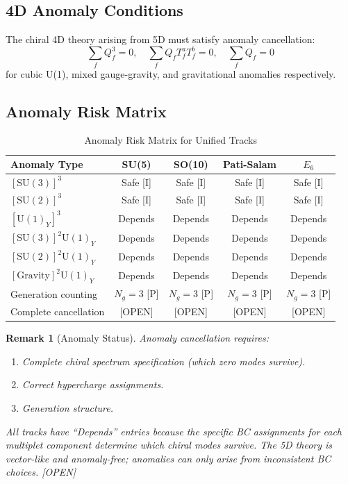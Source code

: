 \documentclass[11pt,a4paper]{article}
\newtheorem{remark}[theorem]{Remark}
\begin{document}
\subsection{4D Anomaly Conditions}

The chiral 4D theory arising from 5D must satisfy anomaly cancellation:
\begin{equation}
\sum_f Q_f^3 = 0, \quad \sum_f Q_f T_f^a T_f^b = 0, \quad \sum_f Q_f = 0
\label{eq:anomaly-conditions}
\end{equation}
for cubic U(1), mixed gauge-gravity, and gravitational anomalies respectively.

\subsection{Anomaly Risk Matrix}

\begin{table}[h]
\centering
\caption{Anomaly Risk Matrix for Unified Tracks}
\label{tab:anomaly-risk}
\begin{tabular}{lcccc}
\toprule
Anomaly Type & SU(5) & SO(10) & Pati-Salam & $E_6$ \\
\midrule
$[\text{SU}(3)]^3$ & Safe [I] & Safe [I] & Safe [I] & Safe [I] \\
$[\text{SU}(2)]^3$ & Safe [I] & Safe [I] & Safe [I] & Safe [I] \\
$[\text{U}(1)_Y]^3$ & Depends & Depends & Depends & Depends \\
$[\text{SU}(3)]^2\text{U}(1)_Y$ & Depends & Depends & Depends & Depends \\
$[\text{SU}(2)]^2\text{U}(1)_Y$ & Depends & Depends & Depends & Depends \\
$[\text{Gravity}]^2\text{U}(1)_Y$ & Depends & Depends & Depends & Depends \\
Generation counting & $N_g = 3$ [P] & $N_g = 3$ [P] & $N_g = 3$ [P] & $N_g = 3$ [P] \\
\midrule
Complete cancellation & [OPEN] & [OPEN] & [OPEN] & [OPEN] \\
\bottomrule
\end{tabular}
\end{table}

\begin{remark}[Anomaly Status]
Anomaly cancellation requires:
\begin{enumerate}
\item Complete chiral spectrum specification (which zero modes survive).
\item Correct hypercharge assignments.
\item Generation structure.
\end{enumerate}
All tracks have ``Depends'' entries because the specific BC assignments for each multiplet
component determine which chiral modes survive. The 5D theory is vector-like and anomaly-free;
anomalies can only arise from inconsistent BC choices. [OPEN]
\end{remark}
\end{document}
